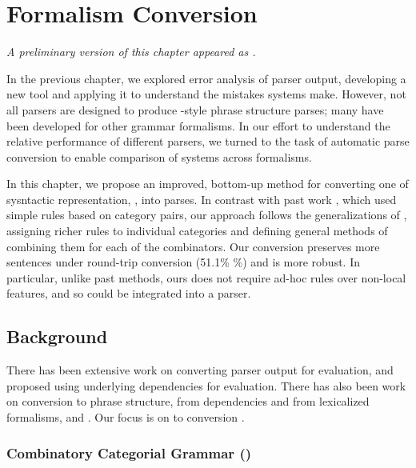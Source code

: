 \chapter{Formalism Conversion} \label{chp:conversion}

\begin{center}
\textit{
  A preliminary version of this chapter appeared as \textcite{Kummerfeld-etal:2012:ACL}.
}
\end{center}

In the previous chapter, we explored error analysis of \ptb parser output, developing a new tool and applying it to understand the mistakes systems make.
However, not all parsers are designed to produce \ptb-style phrase structure parses; many have been developed for other grammar formalisms.
In our effort to understand the relative performance of different parsers, we turned to the task of automatic parse conversion to enable comparison of systems across formalisms.

In this chapter, we propose an improved, bottom-up method for converting one of sysntactic representation, \ccg, into \ptb parses.
In contrast with past work \parencite{Clark-Curran:2009}, which used simple rules based on category pairs, our approach follows the generalizations of \ccg, assigning richer rules to individual categories and defining general methods of combining them for each of the \ccg combinators.
Our conversion preserves more sentences under round-trip conversion (51.1\% \%) and is more robust.
In particular, unlike past methods, ours does not require ad-hoc rules over non-local features, and so could be integrated into a parser.

\section{Background}

There has been extensive work on converting parser output for evaluation, \myeg
\textcite{Lin:1998} and \textcite{Briscoe-Carroll-Graham-Copestake:2002} proposed
using underlying dependencies for evaluation.  There has also been work on
conversion to phrase structure, from dependencies \parencite{Xia:2001,Xia:2009} and
from lexicalized formalisms, \myeg \hpsg \parencite{Matsuzaki-Tsujii:2008} and \mytag
\parencite{Chiang:2000,Sarkar:2001}. Our focus is on \ccg to \ptb conversion
\parencite{Clark-Curran:2009}.

\subsection{Combinatory Categorial Grammar (\ccg)}

